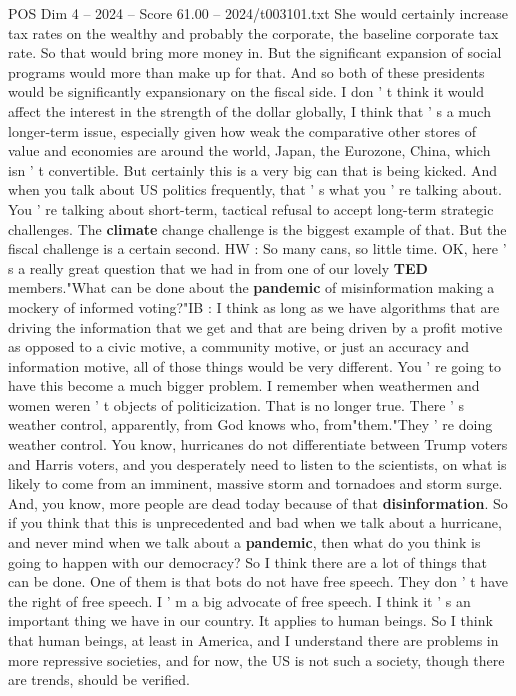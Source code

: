 \begin{textsample}{POS Dim 4 – 2024 – Score 61.00 – 2024/t003101.txt}
She would certainly increase tax rates on the wealthy and probably the corporate, the baseline corporate tax rate.
So that would bring more money in.
But the significant expansion of social programs would more than make up for that.
And so both of these presidents would be significantly expansionary on the fiscal side.
I don ' t think it would affect the interest in the strength of the dollar globally, I think that ' s a much longer-term issue, especially given how weak the comparative other stores of value and economies are around the world, Japan, the Eurozone, China, which isn ' t convertible.
But certainly this is a very big can that is being kicked.
And when you talk about US politics frequently, that ' s what you ' re talking about.
You ' re talking about short-term, tactical refusal to accept long-term strategic challenges.
The \textbf{climate} change challenge is the biggest example of that.
But the fiscal challenge is a certain second.
HW : So many cans, so little time.
OK, here ' s a really great question that we had in from one of our lovely \textbf{TED} members."What can be done about the \textbf{pandemic} of misinformation making a mockery of informed voting?"IB : I think as long as we have algorithms that are driving the information that we get and that are being driven by a profit motive as opposed to a civic motive, a community motive, or just an accuracy and information motive, all of those things would be very different.
You ' re going to have this become a much bigger problem.
I remember when weathermen and women weren ' t objects of politicization.
That is no longer true.
There ' s weather control, apparently, from God knows who, from"them."They ' re doing weather control.
You know, hurricanes do not differentiate between Trump voters and Harris voters, and you desperately need to listen to the scientists, on what is likely to come from an imminent, massive storm and tornadoes and storm surge.
And, you know, more people are dead today because of that \textbf{disinformation}.
So if you think that this is unprecedented and bad when we talk about a hurricane, and never mind when we talk about a \textbf{pandemic}, then what do you think is going to happen with our democracy?
So I think there are a lot of things that can be done.
One of them is that bots do not have free speech.
They don ' t have the right of free speech.
I ' m a big advocate of free speech.
I think it ' s an important thing we have in our country.
It applies to human beings.
So I think that human beings, at least in America, and I understand there are problems in more repressive societies, and for now, the US is not such a society, though there are trends, should be verified.

\end{textsample}
